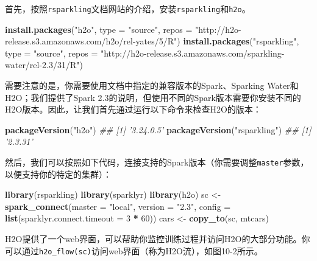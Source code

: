 \documentclass[
]{article}
\newenvironment{Shaded}{\begin{snugshade}}{\end{snugshade}}
\newcommand{\CommentTok}[1]{\textcolor[rgb]{0.56,0.35,0.01}{\textit{#1}}}
\newcommand{\DataTypeTok}[1]{\textcolor[rgb]{0.13,0.29,0.53}{#1}}
\newcommand{\DecValTok}[1]{\textcolor[rgb]{0.00,0.00,0.81}{#1}}
\newcommand{\KeywordTok}[1]{\textcolor[rgb]{0.13,0.29,0.53}{\textbf{#1}}}
\newcommand{\NormalTok}[1]{#1}
\newcommand{\OperatorTok}[1]{\textcolor[rgb]{0.81,0.36,0.00}{\textbf{#1}}}
\newcommand{\StringTok}[1]{\textcolor[rgb]{0.31,0.60,0.02}{#1}}
\begin{document}
首先，按照\texttt{rsparkling}文档网站的介绍，安装\texttt{rsparkling}和\texttt{h2o}。

\begin{Shaded}
\begin{Highlighting}[]
\KeywordTok{install.packages}\NormalTok{(}\StringTok{"h2o"}\NormalTok{, }\DataTypeTok{type =} \StringTok{"source"}\NormalTok{, }\DataTypeTok{repos =} \StringTok{"http://h2o-release.s3.amazonaws.com/h2o/rel-yates/5/R"}\NormalTok{)}
\KeywordTok{install.packages}\NormalTok{(}\StringTok{"rsparkling"}\NormalTok{, }\DataTypeTok{type =} \StringTok{"source"}\NormalTok{, }\DataTypeTok{repos =} \StringTok{"http://h2o-release.s3.amazonaws.com/sparkling-water/rel-2.3/31/R"}\NormalTok{)}
\end{Highlighting}
\end{Shaded}

需要注意的是，你需要使用文档中指定的兼容版本的Spark、Sparking
Water和H2O；我们提供了Spark
2.3的说明，但使用不同的Spark版本需要你安装不同的H2O版本。因此，让我们首先通过运行以下命令来检查H2O的版本：

\begin{Shaded}
\begin{Highlighting}[]
\KeywordTok{packageVersion}\NormalTok{(}\StringTok{"h2o"}\NormalTok{)}
\CommentTok{## [1] '3.24.0.5'}
\KeywordTok{packageVersion}\NormalTok{(}\StringTok{"rsparkling"}\NormalTok{)}
\CommentTok{## [1] '2.3.31'}
\end{Highlighting}
\end{Shaded}

然后，我们可以按照如下代码，连接支持的Spark版本（你需要调整\texttt{master}参数，以便支持你的特定的集群）：

\begin{Shaded}
\begin{Highlighting}[]
\KeywordTok{library}\NormalTok{(rsparkling)}
\KeywordTok{library}\NormalTok{(sparklyr)}
\KeywordTok{library}\NormalTok{(h2o)}
\NormalTok{sc <-}\StringTok{ }\KeywordTok{spark_connect}\NormalTok{(}\DataTypeTok{master =} \StringTok{"local"}\NormalTok{, }\DataTypeTok{version =} \StringTok{"2.3"}\NormalTok{, }\DataTypeTok{config =} \KeywordTok{list}\NormalTok{(}\DataTypeTok{sparklyr.connect.timeout =} \DecValTok{3} \OperatorTok{*}\StringTok{ }
\StringTok{    }\DecValTok{60}\NormalTok{))}
\NormalTok{cars <-}\StringTok{ }\KeywordTok{copy_to}\NormalTok{(sc, mtcars)}
\end{Highlighting}
\end{Shaded}

H2O提供了一个web界面，可以帮助你监控训练过程并访问H2O的大部分功能。你可以通过\texttt{h2o\_flow(sc)}访问web界面（称为H2O流），如图10-2所示。
\end{document}
